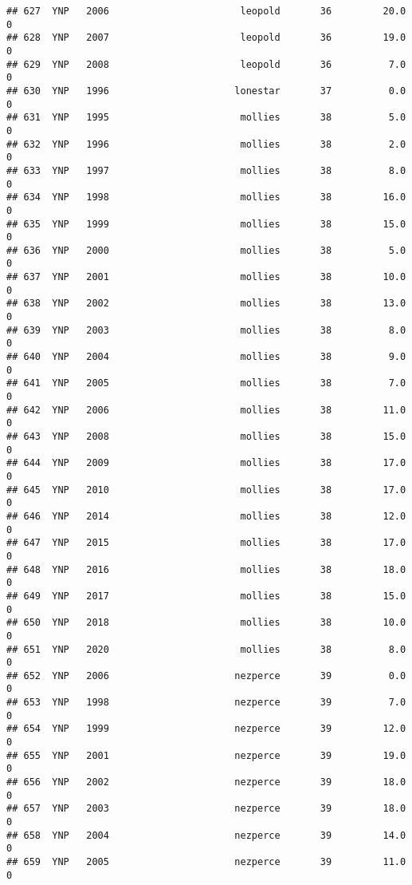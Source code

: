 \documentclass[
]{article}
\begin{document}
\begin{verbatim}
## 627  YNP   2006                       leopold       36         20.0       0
## 628  YNP   2007                       leopold       36         19.0       0
## 629  YNP   2008                       leopold       36          7.0       0
## 630  YNP   1996                      lonestar       37          0.0       0
## 631  YNP   1995                       mollies       38          5.0       0
## 632  YNP   1996                       mollies       38          2.0       0
## 633  YNP   1997                       mollies       38          8.0       0
## 634  YNP   1998                       mollies       38         16.0       0
## 635  YNP   1999                       mollies       38         15.0       0
## 636  YNP   2000                       mollies       38          5.0       0
## 637  YNP   2001                       mollies       38         10.0       0
## 638  YNP   2002                       mollies       38         13.0       0
## 639  YNP   2003                       mollies       38          8.0       0
## 640  YNP   2004                       mollies       38          9.0       0
## 641  YNP   2005                       mollies       38          7.0       0
## 642  YNP   2006                       mollies       38         11.0       0
## 643  YNP   2008                       mollies       38         15.0       0
## 644  YNP   2009                       mollies       38         17.0       0
## 645  YNP   2010                       mollies       38         17.0       0
## 646  YNP   2014                       mollies       38         12.0       0
## 647  YNP   2015                       mollies       38         17.0       0
## 648  YNP   2016                       mollies       38         18.0       0
## 649  YNP   2017                       mollies       38         15.0       0
## 650  YNP   2018                       mollies       38         10.0       0
## 651  YNP   2020                       mollies       38          8.0       0
## 652  YNP   2006                      nezperce       39          0.0       0
## 653  YNP   1998                      nezperce       39          7.0       0
## 654  YNP   1999                      nezperce       39         12.0       0
## 655  YNP   2001                      nezperce       39         19.0       0
## 656  YNP   2002                      nezperce       39         18.0       0
## 657  YNP   2003                      nezperce       39         18.0       0
## 658  YNP   2004                      nezperce       39         14.0       0
## 659  YNP   2005                      nezperce       39         11.0       0

\end{verbatim}
\end{document}
